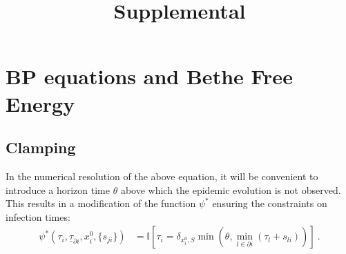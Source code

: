 \documentclass[a4paper, amsfonts, amssymb, amsmath, reprint, showkeys, nofootinbib, twoside, floatfix, pre,superscriptaddress, onecolumn]{revtex4-2}
\begin{document}
\title{Supplemental}

\maketitle

\section{BP equations and Bethe Free Energy}
\label{app:BP_derivation}

\subsection{Clamping} In the numerical resolution of the above equation, it will be convenient to introduce a horizon time $\theta$ above which the epidemic evolution is not observed.
This results in a modification of the function $\psi^*$ ensuring the constraints on infection times:
\begin{align}
	\psi^*(\tau_i,\underline{\tau}_{\partial i},x_i^0,\{s_{ji}\}) &= \mathbb{I}[\tau_i=\delta_{x_i^0,S}\min(\theta,\min_{l\in\partial i}(\tau_l+s_{li}))] \ .
\end{align}
\end{document}
